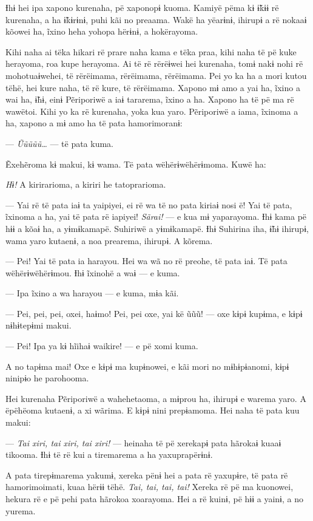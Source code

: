 Ɨhɨ hei ipa xapono kurenaha, pë xaponopɨ kuoma. Kamiyë pëma kɨ ɨ̃kɨɨ rë
kurenaha, a ha ɨ̃kɨrɨnɨ, puhi kãi no preaama. Wakë ha yëarɨnɨ, ihirupɨ a
rë nokaaɨ kõowei ha, ĩxino heha yohopa hërɨnɨ, a hokërayoma. 

Kihi naha ai tëka hikari rë prare naha kama e tëka praa, kihi naha të pë
 kuke herayoma, roa kupe herayoma. Ai të rë rërëɨwei hei kurenaha, tomɨ
 nakɨ nohi rë mohotuaɨwehei, të rërëimama, rërëimama, rërëimama. Pei yo
 ka ha a mori kutou tëhë, hei kure naha, të rë kure, të rërëimama. Xapono
 mɨ amo a yai ha, ĩxino a wai ha, ɨ̃hɨ, einɨ Pẽriporiwë a iaɨ tararema,
 ĩxino a ha. Xapono ha të pë ma rë wawëtoi. Kihi yo ka rë kurenaha, yoka
 kua yaro. Pẽriporiwë a iama, ĩxinoma a ha, xapono a mɨ amo ha të pata
 hamorimoranɨ: 

--- \textit{Ũũũũũ\ldots{}} --- të pata kuma. 

Ẽxehẽroma kɨ makui, kɨ wama. Të pata wëhërɨwëhërɨmoma. Kuwë ha:

\textit{Hɨ!} A kirirarioma, a kiriri he tatoprarioma. 

--- Yai rë të pata iaɨ ta yaipiyei, ei rë wa të no pata kiriaɨ nosi ë!
Yai të pata, ĩxinoma a ha, yai të pata rë iapiyei! \textit{Sãrai!} --- e kua mɨ
yaparayoma. Ɨhɨ kama pë hɨɨ a kõaɨ ha, a yɨmɨkamapë. Suhiriwë a
yɨmɨkamapë. Ɨhɨ Suhirina iha, ɨ̃hɨ ihirupɨ, wama yaro kutaenɨ, a noa
prearema, ihirupɨ. A kõrema.

--- Pei! Yai të pata ia harayou. Hei wa wã no rë preohe, të pata iaɨ. Të
pata wëhërɨwëhërɨmou. Ɨhɨ ĩxinohë a waɨ --- e kuma. 

--- Ipa ĩxino a wa harayou --- e kuma, mɨa kãi. 

--- Pei, pei, pei, oxei, haɨmo! Pei, pei oxe, yai kë ũũũ! --- oxe kɨpɨ
kupɨma, e kɨpɨ nɨhɨtepɨmi makui. 

--- Pei! Ipa ya kɨ hĩihaɨ waikire! --- e pë xomi kuma. 

A no tapɨma mai! Oxe e kɨpɨ ma kupɨnowei, e kãi mori no mɨhɨpɨanomi,
kɨpɨ ninipɨo he parohooma. 

Hei kurenaha Pẽriporiwë a wahehetaoma, a mɨprou ha, ihirupɨ e warema
yaro. A ëpëhëoma kutaenɨ, a xi wãrima. E kɨpɨ nini prepɨamoma. Hei naha
të pata kuu makui:

--- \textit{Tai xiri, tai xiri, tai xiri!} --- heinaha të pë xerekapɨ pata
hãrokaɨ kuaaɨ tikooma. Ɨhɨ të rë kui a tiremarema a ha yaxuprapërɨnɨ. 

A pata tirepɨmarema yakumɨ, xereka pënɨ hei a pata rë yaxupɨre, të pata
rë hamorimoimati, kuaa hërɨɨ tëhë. \textit{Tai, tai, tai, tai!} Xereka rë pë ma
kuonowei, hekura rë e pë pehi pata hãrokoa xoarayoma. Hei a rë kuinɨ, pë
hɨɨ a yainɨ, a no yurema. 

